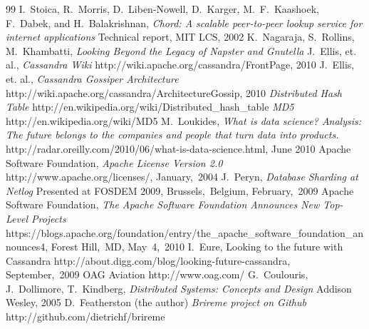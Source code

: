 \documentclass[twocolumn]{article}
\begin{document}
\begin{thebibliography} {99}
 I.~Stoica, R.~Morris, D.~Liben-Nowell, D.~Karger, M.~F.~Kaashoek, F.~Dabek, and H.~Balakrishnan, {\sl Chord: A scalable peer-to-peer lookup service for internet applications} Technical report, MIT LCS, 2002
K.~Nagaraja, S.~Rollins, M.~Khambatti, {\sl Looking Beyond the Legacy of Napster and Gnutella}
 J.~Ellis, et. al., {\sl Cassandra Wiki} http://wiki.apache.org/cassandra/FrontPage, 2010
 J.~Ellis, et. al., {\sl Cassandra Gossiper Architecture} http://wiki.apache.org/cassandra/ArchitectureGossip, 2010
 {\sl Distributed Hash Table} http://en.wikipedia.org/wiki/Distributed\_hash\_table
 {\sl MD5} http://en.wikipedia.org/wiki/MD5
 M.~Loukides, {\sl What is data science? Analysis: The future belongs to the companies and people that turn data into products.} http://radar.oreilly.com/2010/06/what-is-data-science.html, June 2010
 Apache Software Foundation, {\sl Apache License Version 2.0}  http://www.apache.org/licenses/, January,~2004
 J.~Peryn, {\sl Database Sharding at Netlog} Presented at FOSDEM 2009, Brussels,~Belgium, February,~2009
 Apache Software Foundation, {\sl The Apache Software Foundation Announces New Top-Level Projects} https://blogs.apache.org/foundation/entry/the\_apache\_software\_foundation\_announces4, Forest Hill,~MD, May~4,~2010
 I.~Eure, {Looking to the future with Cassandra} http://about.digg.com/blog/looking-future-cassandra, September,~2009
 OAG Aviation http://www.oag.com/
 G.~Coulouris, J.~Dollimore, T.~Kindberg, {\sl Distributed Systems: Concepts and Design} Addison Wesley, 2005
 D.~Featherston (the author) {\sl Brireme project on Github} http://github.com/dietrichf/brireme
\end{thebibliography}
\end{document}
